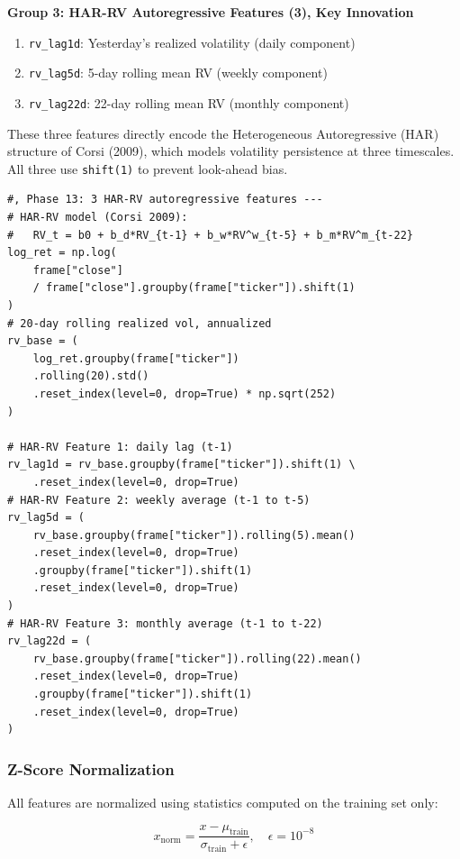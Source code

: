 \documentclass[12pt,a4paper]{article}
\begin{document}
\textbf{Group 3: HAR-RV Autoregressive Features (3), Key Innovation}
\begin{enumerate}
    \item \texttt{rv\_lag1d}: Yesterday's realized volatility (daily component)
    \item \texttt{rv\_lag5d}: 5-day rolling mean RV (weekly component)
    \item \texttt{rv\_lag22d}: 22-day rolling mean RV (monthly component)
\end{enumerate}

These three features directly encode the Heterogeneous Autoregressive (HAR) structure of Corsi (2009), which models volatility persistence at three timescales. All three use \texttt{shift(1)} to prevent look-ahead bias.

\begin{lstlisting}[caption={Price feature engineering, HAR-RV features (src/features/price\_features.py)}]
#, Phase 13: 3 HAR-RV autoregressive features ---
# HAR-RV model (Corsi 2009):
#   RV_t = b0 + b_d*RV_{t-1} + b_w*RV^w_{t-5} + b_m*RV^m_{t-22}
log_ret = np.log(
    frame["close"]
    / frame["close"].groupby(frame["ticker"]).shift(1)
)
# 20-day rolling realized vol, annualized
rv_base = (
    log_ret.groupby(frame["ticker"])
    .rolling(20).std()
    .reset_index(level=0, drop=True) * np.sqrt(252)
)

# HAR-RV Feature 1: daily lag (t-1)
rv_lag1d = rv_base.groupby(frame["ticker"]).shift(1) \
    .reset_index(level=0, drop=True)
# HAR-RV Feature 2: weekly average (t-1 to t-5)
rv_lag5d = (
    rv_base.groupby(frame["ticker"]).rolling(5).mean()
    .reset_index(level=0, drop=True)
    .groupby(frame["ticker"]).shift(1)
    .reset_index(level=0, drop=True)
)
# HAR-RV Feature 3: monthly average (t-1 to t-22)
rv_lag22d = (
    rv_base.groupby(frame["ticker"]).rolling(22).mean()
    .reset_index(level=0, drop=True)
    .groupby(frame["ticker"]).shift(1)
    .reset_index(level=0, drop=True)
)
\end{lstlisting}

\subsubsection{Z-Score Normalization}

All features are normalized using statistics computed on the training set only:

\begin{equation}
    x_{\text{norm}} = \frac{x - \mu_{\text{train}}}{\sigma_{\text{train}} + \epsilon}, \quad \epsilon = 10^{-8}
\end{equation}
\end{document}
